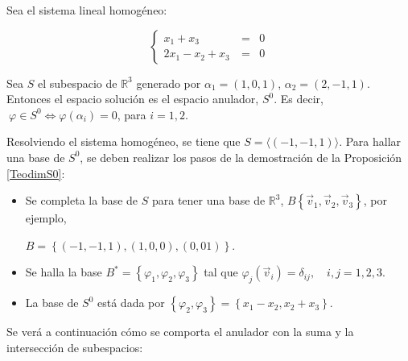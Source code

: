 \begin{example}
Sea el sistema lineal homogéneo:


\begin{equation} 
\left\{ \begin{array} {ccl} \nonumber
                    x_1+ x_3 &\ =&0      \\
                     2x_1-x_2+x_3 &\ = &0 \label{ejemplosistdual}
                   \end{array}
           \right.
\end{equation}





\bigskip


Sea $S$ el subespacio de $\mathbb{R}^3$ generado por $\alpha_1=(1,0,1)$, $\alpha_2=(2,-1, 1)$. Entonces el espacio solución es el espacio anulador,  $S^0$.
Es decir,  $~\varphi\in S^0 \Leftrightarrow  \varphi(\alpha_i)=0$, para $i=1,2$.

\bigskip
Resolviendo el sistema homogéneo, se tiene que $S= \langle (-1,-1,1)\rangle$. Para hallar una base de $S^0$, se deben realizar los pasos de la demostración de la Proposición \ref{TeodimS0}:
\begin{itemize}
    \item 
    Se completa la base de $S$ para tener una base de $\mathbb{R}^3$, $B\left\{\vec{v}_1,\vec{v}_2, \vec{v}_3\right\}$, por ejemplo,
    
    $B=\left\{(-1,-1,1),(1,0,0),(0,0 1)\right\} $.
\item
Se halla la base $ B^* = \left\{\varphi_1,\varphi_2, \varphi_3 \right\}$ tal que  $\varphi_j(\vec{v}_i)= \delta_{ij}, \quad i,j= 1,2,3$.
 \item   
La base de $S^0$ está dada por $  \left\{\varphi_{2}, \varphi_3 \right\}= \left\{ x_1-x_2, x_2+x_3 \right\} $.
\end{itemize}
\end{example}




Se verá a continuación cómo se comporta el anulador con la suma y la intersección de subespacios:

